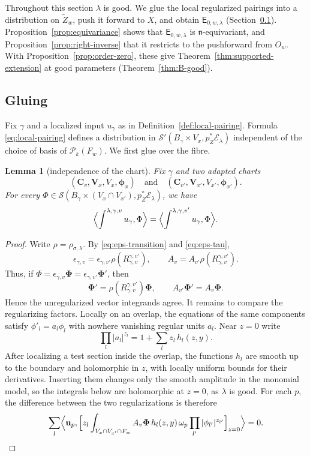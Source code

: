 \documentclass[a4paper,12pt]{amsart}
\numberwithin{equation}{section}
\newtheorem{lemma}[theorem]{Lemma}
\theoremstyle{definition}
\theoremstyle{remark}
\newcommand{\V}{\mathbf V}
\newcommand{\fn}{\mathfrak n}
\newcommand{\mcS}{\mathcal S}
\newcommand{\mcE}{\mathcal E}
\newcommand{\mcP}{\mathcal P}
\newcommand{\E}{\mathsf E}
\newcommand{\cC}{\mathbf C}
\begin{document}
Throughout this section $\lambda$ is good. We glue the local regularized pairings into a distribution on $\tilde Z_w$, push it forward to $X$, and obtain $\E_{0,w,\lambda}$ (Section~\ref{ssec:gluing}). Proposition~\ref{prop:equivariance} shows that $\E_{0,w,\lambda}$ is $\fn$-equivariant, and Proposition~\ref{prop:right-inverse} that it restricts to the pushforward from $O_w$. With Proposition~\ref{prop:order-zero}, these give Theorem~\ref{thm:supported-extension} at good parameters (Theorem~\ref{thm:B-good}).

\subsection{Gluing}\label{ssec:gluing}

Fix $\gamma$ and a localized input $u_\gamma$ as in Definition~\ref{def:local-pairing}. Formula \eqref{eq:local-pairing} defines a distribution in $\mcS'(B_\gamma\times V_x,p_Z^*\mcE_\lambda)$ independent of the choice of basis of $\mcP_k(F_w)$. We first glue over the fibre.

\begin{lemma}[independence of the chart]\label{lem:overlap}
Fix $\gamma$ and two adapted charts
\[
 (\cC_v,\V_x,V_x,\boldsymbol\phi_x)
 \quad\text{and}\quad
 (\cC_{v'},\V_{x'},V_{x'},\boldsymbol\phi_{x'}).
\]
For every $\Phi\in\mcS(B_\gamma\times(V_x\cap V_{x'}),p_Z^*\mcE_\lambda)$, we have
\[
 \Bigl\langle\int^{\lambda,\gamma,v}u_\gamma,\Phi\Bigr\rangle
 =\Bigl\langle\int^{\lambda,\gamma,v'}u_\gamma,\Phi\Bigr\rangle.
\]
\end{lemma}

\begin{proof}
Write $\rho=\rho_{\sigma,\lambda}$. By \eqref{eq:eps-transition} and \eqref{eq:eps-tau},
\[
 \epsilon_{\gamma,v}=\epsilon_{\gamma,v'}\rho(R^{\gamma,v'}_{\gamma,v}),\qquad
 A_v=A_{v'}\rho(R^{\gamma,v'}_{\gamma,v}).
\]
Thus, if $\Phi=\epsilon_{\gamma,v}\boldsymbol\Phi=\epsilon_{\gamma,v'}\boldsymbol\Phi'$, then
\[
 \boldsymbol\Phi'=\rho(R^{\gamma,v'}_{\gamma,v})\boldsymbol\Phi,\qquad
 A_{v'}\boldsymbol\Phi'=A_v\boldsymbol\Phi.
\]
Hence the unregularized vector integrands agree. It remains to compare the regularizing factors. Locally on an overlap, the equations of the same components satisfy $\phi'_l=a_l\phi_l$ with nowhere vanishing regular units $a_l$. Near $z=0$ write
\[
 \prod_l|a_l|^{z_l}=1+\sum_lz_l\,h_l(z,y).
\]
After localizing a test section inside the overlap, the functions $h_l$ are smooth up to the boundary and holomorphic in $z$, with locally uniform bounds for their derivatives. Inserting them changes only the smooth amplitude in the monomial model, so the integrals below are holomorphic at $z=0$, as $\lambda$ is good. For each $p$, the difference between the two regularizations is therefore
\[
 \sum_l\Bigl\langle\mathbf u_p,\Bigl[z_l\int_{V_x\cap V_{x'}\cap F_w}A_v\boldsymbol\Phi\,h_l(z,y)\,\omega_p\prod_{l'}|\phi_{l'}|^{z_{l'}}\Bigr]_{z=0}\Bigr\rangle=0.
\]
\end{proof}
\end{document}
